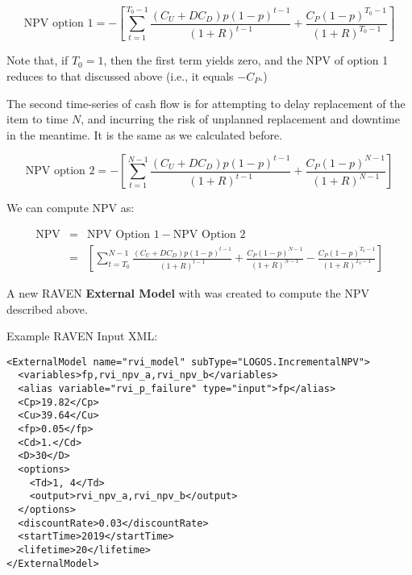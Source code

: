 
\begin{equation}\label{npv_10}
\mbox{NPV option }1= - \left[  \sum _{t=1}^{T_{0}-1}\frac{ \left( C_{U}+DC_{D} \right) p \left( 1-p \right) ^{t-1}}{ \left( 1+R \right) ^{t-1}}+\frac{C_{P} \left( 1-p \right) ^{T_{0}-1}}{ \left( 1+R \right) ^{T_{0}-1}} \right]
\end{equation}

Note that, if  \( T_{0}=1 \),  then the first term yields zero, and the NPV of
option 1 reduces to that discussed above (i.e., it equals  \( -C_{P} \).)\par

The second time-series of cash flow is for attempting to delay replacement of
the item to time  \( N \), and incurring the risk of unplanned replacement
and downtime in the meantime. It is the same as we calculated before. \par

\begin{equation}\label{npv_11}
\mbox{NPV option }2= - \left[  \sum _{t=1}^{N-1}\frac{ \left( C_{U}+DC_{D} \right) p \left( 1-p \right) ^{t-1}}{ \left( 1+R \right) ^{t-1}}+\frac{C_{P} \left( 1-p \right) ^{N-1}}{ \left( 1+R \right) ^{N-1}} \right]
\end{equation}

We can compute  \( \text{NPV} \)  as:\par

\begin{eqnarray}\label{npv_12}
\mbox{NPV}&=&\mbox{NPV Option }1-\mbox{NPV Option }2\\
&=& \left[  \sum _{t=T_{0}}^{N-1}\frac{ \left( C_{U}+DC_{D} \right) p \left( 1-p \right) ^{t-1}}{ \left( 1+R \right) ^{t-1}}+\frac{C_{P} \left( 1-p \right) ^{N-1}}{ \left( 1+R \right) ^{N-1}}-\frac{C_{P} \left( 1-p \right) ^{T_{0}-1}}{ \left( 1+R \right) ^{T_{0}-1}} \right]
\end{eqnarray}

A new RAVEN \textbf{External Model} with  
was created to compute the NPV described above.

Example RAVEN Input  XML:
\begin{lstlisting}[style=XML]
<ExternalModel name="rvi_model" subType="LOGOS.IncrementalNPV">
  <variables>fp,rvi_npv_a,rvi_npv_b</variables>
  <alias variable="rvi_p_failure" type="input">fp</alias>
  <Cp>19.82</Cp>
  <Cu>39.64</Cu>
  <fp>0.05</fp>
  <Cd>1.</Cd>
  <D>30</D>
  <options>
    <Td>1, 4</Td>
    <output>rvi_npv_a,rvi_npv_b</output>
  </options>
  <discountRate>0.03</discountRate>
  <startTime>2019</startTime>
  <lifetime>20</lifetime>
</ExternalModel>
\end{lstlisting}

